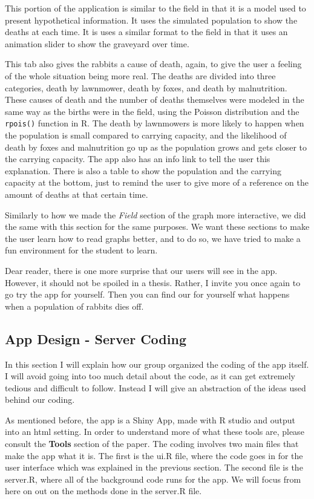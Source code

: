 \documentclass[titlepage]{article}\usepackage[]{graphicx}\usepackage[]{color}
\begin{document}
This portion of the application is similar to the field in that it is a model used to present hypothetical information. It uses the simulated population to show the deaths at each time. It is uses a similar format to the field in that it uses an animation slider to show the graveyard over time. 

This tab also gives the rabbits a cause of death, again, to give the user a feeling of the whole situation being more real. The deaths are divided into three categories, death by lawnmower, death by foxes, and death by malnutrition. These causes of death and the number of deaths themselves were modeled in the same way as the births were in the field, using the Poisson distribution and the \texttt{rpois()} function in R. The death by lawnmowers is more likely to happen when the population is small compared to carrying capacity, and the likelihood of death by foxes and malnutrition go up as the population grows and gets closer to the carrying capacity. The app also has an info link to tell the user this explanation. There is also a table to show the population and the carrying capacity at the bottom, just to remind the user to give more of a reference on the amount of deaths at that certain time. 

Similarly to how we made the \textit{Field} section of the graph more interactive, we did the same with this section for the same purposes. We want these sections to make the user learn how to read graphs better, and to do so, we have tried to make a fun environment for the student to learn.

Dear reader, there is one more surprise that our users will see in the app. However, it should not be spoiled in a thesis. Rather, I invite you once again to go try the app for yourself. Then you can find our for yourself what happens when a population of rabbits dies off.




\subsection{App Design - Server Coding}

In this section I will explain how our group organized the coding of the app itself. I will avoid going into too much detail about the code, as it can get extremely tedious and difficult to follow. Instead I will give an abstraction of the ideas used behind our coding.

As mentioned before, the app is a Shiny App, made with R studio and output into an html setting. In order to understand more of what these tools are, please consult the \textbf{Tools} section of the paper. The coding involves two main files that make the app what it is. The first is the ui.R file, where the code goes in for the user interface which was explained in the previous section. The second file is the server.R, where all of the background code runs for the app. We will focus from here on out on the methods done in the server.R file. 
\end{document}
